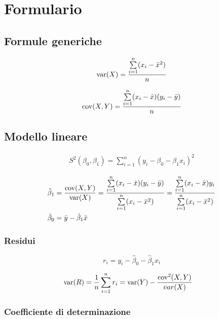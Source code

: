 \chapter{Formulario}

\section{Formule generiche}

\begin{align*}
\text{var}(X) = \frac{\sum\limits_{i=1}^n (x_i - \bar{x}^2)}{n}
\end{align*}

\begin{align*}
\text{cov}(X,Y) = \frac{\sum\limits_{i=1}^n (x_i - \hat{x})(y_i - \bar{y})}{n}
\end{align*}

\section{Modello lineare}

\begin{align*}
S^2(\beta_0, \beta_1) = \sum\limits_{i=1}^n (y_i - \beta_0 - \beta_1 x_i)^2
\end{align*}

\begin{align*}
\hat{\beta}_1 &= \frac{\cov(X,Y)}{\var(X)} 
= \frac{\sum\limits_{i=1}^n (x_i - \hat{x})(y_i - \bar{y})}{\sum\limits_{i=1}^n (x_i - \bar{x}^2)} 
= \frac{\sum\limits_{i=1}^n (x_i - \bar{x})y_i}{\sum\limits_{i=1}^n (x_i - \bar{x}^2)}  \\
%
\hat{\beta}_0 &= \bar{y} - \hat{\beta}_1 \bar{x}
\end{align*}

\subsection{Residui}

$$
r_i = y_i - \hat{\beta}_0 - \hat{\beta}_1 x_i
$$

\begin{align*}
\text{var}(R) &= \frac{1}{n}\sum\limits_{i=1}^n r_i
= \text{var}(Y) - \frac{\text{cov}^2(X,Y)}{var(X)}
\end{align*}

\subsection{Coefficiente di determinazione}

